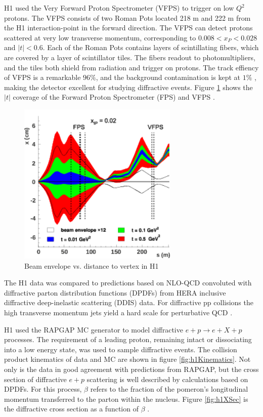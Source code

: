 H1 used the Very Forward Proton Spectrometer (VFPS) to trigger on low $Q^2$ protons. The VFPS consists of two Roman Pots located 218 m and 222 m from the H1 interaction-point in the forward direction. The VFPS can detect protons scattered at very low transverse momentum, corresponding to $0.008 < x_{P} < 0.028$ and $|t|<0.6$. Each of the Roman Pots contains layers of scintillating fibers, which are covered by a layer of scintillator tiles. The fibers readout to photomultipliers, and the tiles both shield from radiation and trigger on protons. The track effiency of VFPS is a remarkable $96 \%$, and the background contamination is kept at $1 \%$ , making the detector excellent for studying diffractive events. Figure \ref{fig:h1BeamEnv} shows the $|t|$ coverage of the Forward Proton Spectrometer (FPS) and VFPS \cite{Andreev:2015cwa}.

\begin{figure}[h!]
\begin{centering}
\includegraphics[width=3in]{Chapter1/importfigs/fig7_h1_2015.png}
\par\end{centering}
\caption{Beam envelope vs. distance to vertex in H1 \cite{Andreev:2015cwa} \label{fig:h1BeamEnv}}
\end{figure}

The H1 data was compared to predictions based on NLO-QCD convoluted with diffractive parton distribution functions (DPDFs) from HERA inclusive diffractive deep-inelastic scattering (DDIS) data. For diffractive pp collisions the high transverse momentum jets yield a hard scale for perturbative QCD \cite{Aaron:2010su}.

H1 used the RAPGAP MC generator to model diffractive $e+p \rightarrow e+X+p$ processes. The requirement of a leading proton, remaining intact or dissociating into a low energy state, was used to sample diffractive events. The collision product kinematics of data and MC are shown in figure \ref{fig:h1Kinematics}. Not only is the data in good agreement with predictions from RAPGAP, but the cross section of diffractive $e+p$ scattering is well described by calculations based on DPDFs. For this process, $\beta$ refers to the fraction of the pomeron's longitudinal momentum transferred to the parton within the nucleus. Figure \ref{fig:h1XSec} is the diffractive cross section as a function of $\beta$ \cite{Aaron:2010aa}. 

